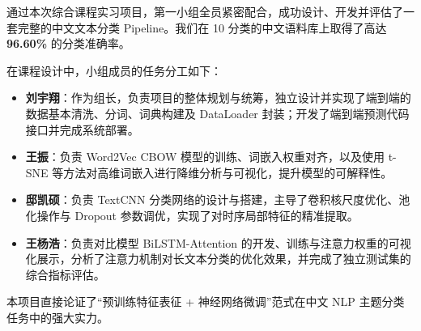 \documentclass[UTF8,a4paper,11pt]{ctexart}
\begin{document}
通过本次综合课程实习项目，第一小组全员紧密配合，成功设计、开发并评估了一套完整的中文文本分类 Pipeline。我们在 10 分类的中文语料库上取得了高达 \textbf{96.60\%} 的分类准确率。

在课程设计中，小组成员的任务分工如下：
\begin{itemize}
    \item \textbf{刘宇翔}：作为组长，负责项目的整体规划与统筹，独立设计并实现了端到端的数据基本清洗、分词、词典构建及 DataLoader 封装；开发了端到端预测代码接口并完成系统部署。
    \item \textbf{王振}：负责 Word2Vec CBOW 模型的训练、词嵌入权重对齐，以及使用 t-SNE 等方法对高维词嵌入进行降维分析与可视化，提升模型的可解释性。
    \item \textbf{邸凯硕}：负责 TextCNN 分类网络的设计与搭建，主导了卷积核尺度优化、池化操作与 Dropout 参数调优，实现了对时序局部特征的精准提取。
    \item \textbf{王杨浩}：负责对比模型 BiLSTM-Attention 的开发、训练与注意力权重的可视化展示，分析了注意力机制对长文本分类的优化效果，并完成了独立测试集的综合指标评估。
\end{itemize}

本项目直接论证了“预训练特征表征 + 神经网络微调”范式在中文 NLP 主题分类任务中的强大实力。
\end{document}
